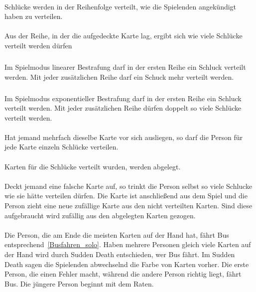 \paragraph{}
Schlücke werden in der Reihenfolge verteilt, wie die Spielenden angekündigt haben zu verteilen.

\paragraph{}\label{Busfahren_group:Spielablauf:Bestrafung}
Aus der Reihe, in der die aufgedeckte Karte lag, ergibt sich wie viele Schlücke verteilt werden dürfen
\subparagraph{}\label{Busfahren_group:Spielablauf:Bestrafung:linear}
Im Spielmodus linearer Bestrafung darf in der ersten Reihe ein Schluck verteilt werden.
Mit jeder zusätzlichen Reihe darf ein Schuck mehr verteilt werden.

\subparagraph{}\label{Busfahren_group:Spielablauf:Bestrafung:exponentiell}
Im Spielmodus exponentieller Bestrafung darf in der ersten Reihe ein Schluck verteilt werden.
Mit jeder zusätzlichen Reihe dürfen doppelt so viele Schlücke verteilt werden.

\paragraph{}
Hat jemand mehrfach dieselbe Karte vor sich ausliegen, so darf die Person für jede Karte einzeln Schlücke verteilen.

\paragraph{}
Karten für die Schlücke verteilt wurden, werden abgelegt.

\paragraph{}\label{Busfahren_group:Spielablauf:Ziehen}
Deckt jemand eine falsche Karte auf, so trinkt die Person selbst so viele Schlucke wie sie hätte verteilen dürfen.
Die Karte ist anschließend aus dem Spiel und die Person zieht eine neue zufällige Karte aus den nicht verteilten Karten.
Sind diese aufgebraucht wird zufällig aus den abgelegten Karten gezogen.

\paragraph{}
Die Person, die am Ende die meisten Karten auf der Hand hat, fährt Bus entsprechend~\ref{Busfahren_solo}.
Haben mehrere Personen gleich viele Karten auf der Hand wird durch Sudden Death entschieden, wer Bus fährt.
Im Sudden Death sagen die Spielenden abwechselnd die Farbe von Karten vorher.
Die erste Person, die einen Fehler macht, während die andere Person richtig liegt, fährt Bus.
Die jüngere Person beginnt mit dem Raten.

